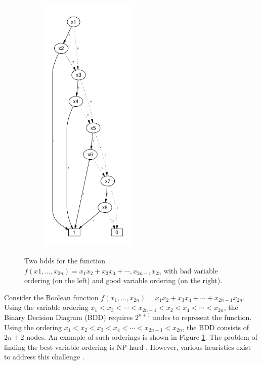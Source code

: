 \documentclass[pdflatex,sn-mathphys-num]{sn-jnl}%
\theoremstyle{thmstyleone}%
\theoremstyle{thmstyletwo}%
\theoremstyle{thmstylethree}%
\begin{document}
\begin{figure}[H]
\begin{subfigure}{0.3\textwidth}
                \includegraphics[width=0.5\textwidth]{Figures/BDD_Variable_Ordering_Good.pdf}
            \end{subfigure}
            \caption{Two bdds for the function $f(x1,\dots, x_{2n}) = x_1x_2 + x_3x_4 + \cdots, x_{2n-1}x_{2n}$ with bad variable ordering (on the left) and good variable ordering (on the right).}
            \label{figure::ordering}
        \end{figure}

        Consider the Boolean function $f(x_1, \dots, x_{2n}) = x_1x_2 + x_3x_4 + \cdots + x_{2n-1}x_{2n}$. Using the variable ordering $x_1 < x_3 < \cdots < x_{2n-1} < x_2 < x_4 < \cdots < x_{2n}$, the Binary Decision Diagram (BDD) requires $2^{n+1}$ nodes to represent the function. Using the ordering $x_1 < x_2 < x_3 < x_4 < \cdots < x_{2n-1} < x_{2n}$, the BDD consists of $2n + 2$ nodes. An example of such orderings is shown in Figure \ref{figure::ordering}. The problem of finding the best variable ordering is NP-hard \cite{BDD_np-hard}. However, various heuristics exist to address this challenge \cite{BDD_heuristics}.
\end{document}
